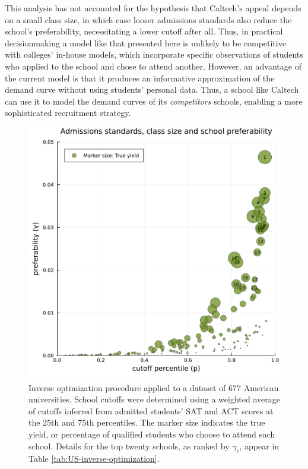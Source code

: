 \documentclass[12pt]{article}
\numberwithin{equation}{subsection}
\theoremstyle{definition}
\begin{document}
This analysis has not accounted for the hypothesis that Caltech's appeal depends on a small class size, in which case looser admissions standards also reduce the school's preferability, necessitating a lower cutoff after all. Thus, in practical decisionmaking a model like that presented here is unlikely to be competitive with colleges' in-house models, which incorporate specific observations of students who applied to the school and chose to attend another. However, an advantage of the current model is that it produces an informative approximation of the demand curve without using students' personal data. Thus, a school like Caltech can use it to model the demand curves of its \emph{competitors} schools, enabling a more sophisticated recruitment strategy. 

\begin{figure}
\begin{center}\includegraphics[width=\linewidth, ]{plots/US-cutoff-gamma.pdf}\end{center}
\captionsetup{singlelinecheck=off}
    \caption[.]{Inverse optimization procedure applied to a dataset of 677 American universities. School cutoffs were determined using a weighted average of cutoffs inferred from admitted students' SAT and ACT scores at the 25th and 75th percentiles. The marker size indicates the true yield, or percentage of qualified students who choose to attend each school. Details for the top twenty schools, as ranked by $\gamma_c$, appear in Table \ref{tab:US-inverse-optimization}.}
\label{US-cutoff-gamma}
\end{figure}
\end{document}
